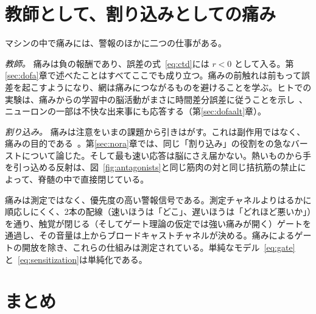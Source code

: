 \section{教師として、割り込みとしての痛み}

マシンの中で痛みには、警報のほかに二つの仕事がある。

\emph{教師。} 痛みは負の報酬であり、誤差の式~\eqref{eq:ctd}には $r<0$ として入る。第\ref{sec:dofa}章で述べたことはすべてここでも成り立つ。痛みの前触れは前もって誤差を起こすようになり、網は痛みにつながるものを避けることを学ぶ。ヒトでの実験は、痛みからの学習中の脳活動がまさに時間差分誤差に従うことを示し~\cite{Seymour2004}、ニューロンの一部は不快な出来事にも応答する（第\ref{sec:dofaalt}章）。

\emph{割り込み。} 痛みは注意をいまの課題から引きはがす。これは副作用ではなく、痛みの目的である~\cite{EcclestonCrombez1999}。第\ref{sec:nora}章では、同じ「割り込み」の役割をの急なバーストについて論じた。そして最も速い応答は脳にさえ届かない。熱いものから手を引っ込める反射は、図~\ref{fig:antagonists}と同じ筋肉の対と同じ拮抗筋の禁止によって、脊髄の中で直接閉じている。

\begin{keyblock}
\begin{proposition}[警報信号]
\label{prop:pain}
痛みは測定ではなく、優先度の高い警報信号である。測定チャネルよりはるかに順応しにくく、2本の配線（速いほうは「どこ」、遅いほうは「どれほど悪いか」）を通り、触覚が閉じる（そしてゲート理論の仮定では強い痛みが開く）ゲートを通過し、その音量は上からブロードキャストチャネルが決める。痛みによるゲートの開放を除き、これらの仕組みは測定されている。単純なモデル~\eqref{eq:gate}と~\eqref{eq:sensitization}は単純化である。
\end{proposition}
\end{keyblock}

\section{まとめ}

